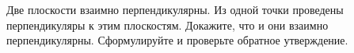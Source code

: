 Две плоскости взаимно перпендикулярны. Из одной точки проведены перпендикуляры к этим плоскостям. Докажите, что и они взаимно перпендикулярны. Сформулируйте и проверьте обратное утверждение.